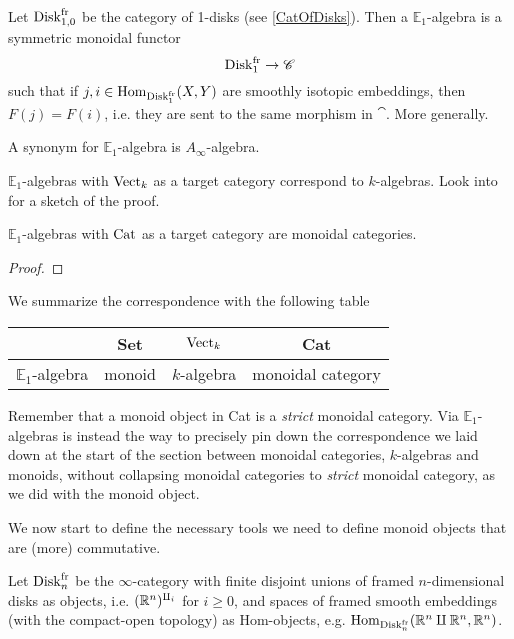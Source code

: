 \begin{defn}
    Let $\operatorname{Disk}_{1,0}^{\operatorname{fr}}$ be the category of 1-disks (see \ref{CatOfDisks}). Then a $\mathbb{E}_1$-algebra is a symmetric monoidal functor $$\operatorname{Disk}_{1}^{\operatorname{fr}}\to \mathscr{C}$$ such that if $j,i\in \operatorname{Hom}_{\operatorname{Disk}_{1}^{\operatorname{fr}}}(X,Y)$ are smoothly isotopic embeddings, then  $F(j)=F(i)$, i.e. they are sent to the same morphism in $\cat$. More generally.
\end{defn}
\begin{notat}
    A synonym for $\mathbb{E}_1$-algebra is $A_\infty$-algebra.
\end{notat}
\begin{thm}
    $\mathbb{E}_1$-algebras with $\operatorname{Vect}_k$ as a target category correspond to $k$-algebras. Look into \cite{Tanaka_2020} for a sketch of the proof.
\end{thm}
\begin{thm}
    $\mathbb{E}_1$-algebras with $\operatorname{Cat}$ as a target category are monoidal categories.
\end{thm}
\begin{proof}
\end{proof}
We summarize the correspondence with the following table
\begin{center}
    \begin{tabular}{|c||c|c|c|}
        \hline
        \phantom{h} & Set & $\operatorname{Vect}_k$ & Cat \\ [0.5ex]
        \hline\hline
        $\mathbb{E}_1$-algebra & monoid & $k$-algebra & monoidal category  \\
        \hline
    \end{tabular}
\end{center}
\begin{rem}
    Remember that a monoid object in Cat is a \emph{strict} monoidal category. Via $\mathbb{E}_1$-algebras is instead the way to precisely pin down the correspondence we laid down at the start of the section between monoidal categories, $k$-algebras and monoids, without collapsing monoidal categories to \emph{strict} monoidal category, as we did with the monoid object.
\end{rem}
We now start to define the necessary tools we need to define monoid objects that are (more) commutative.
\begin{defn}
    Let $\operatorname{Disk}_{n}^{\operatorname{fr}}$ be the $\infty$-category with finite disjoint
    unions of framed $n$-dimensional disks as objects, i.e. $(\mathbb{R}^{n})^{\amalg_{i}}$ for $i\geq 0$, and spaces of
    framed smooth embeddings (with the compact-open topology) as Hom-objects, e.g. $\operatorname{Hom}_{\operatorname{Disk}_{n}^{\operatorname{fr}}}(\mathbb{R}^n\amalg\mathbb{R}^n,\mathbb{R}^n)$.
\end{defn}
